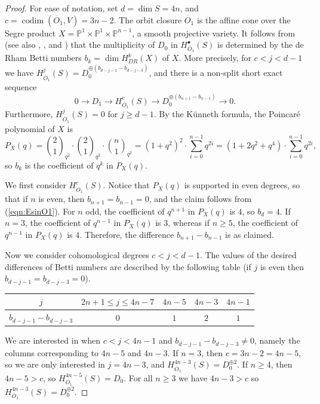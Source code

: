 \documentclass[11pt,reqno]{amsart}
\newcommand{\codim}{\operatorname{codim}}
\newcommand{\ol}[1]{\overline{#1}}
\numberwithin{equation}{section}
\begin{document}
\begin{proof}
For ease of notation, set $d=\dim S=4n$, and $c=\codim(\ol{O}_1, V)=3n-2$. The orbit closure $\ol{O}_1$ is the affine cone over the Segre product $X=\mathbb{P}^1\times \mathbb{P}^1\times \mathbb{P}^{n-1}$, a smooth projective variety. It follows from \cite[Theorem 4.8, Theorem 6.4]{hartshorne2018simple} (see also \cite[Main Theorem 1.2]{switala}, \cite[Theorem]{garsab}, and \cite[Theorem 3.1]{LSW}) that the multiplicity of $D_0$ in $H^{\bullet}_{\ol{O}_1}(S)$ is determined by the de Rham Betti numbers $b_k=\dim H^k_{DR}(X)$ of $X$. More precisely, for $c<j<d-1$ we have $H^j_{\ol{O}_1}(S)=D_0^{\oplus (b_{d-j-1}-b_{d-j-3})}$, and there is a non-split short exact sequence
\begin{equation}\label{eqn:EsinO1}
0\to D_1 \to H^{c}_{\ol{O}_1}(S)\to D_0^{\oplus (b_{n+1}-b_{n-1})}\to 0.
\end{equation}
Furthermore, $H^j_{\ol{O}_1}(S)=0$ for $j\geq d-1$. By the K\"{u}nneth formula, the Poincar\'{e} polynomial of $X$ is
$$
P_X(q)=\binom{2}{1}_{q^2}\cdot \binom{2}{1}_{q^2}\cdot \binom{n}{1}_{q^2}=(1+q^2)^2\cdot \sum_{i=0}^{n-1} q^{2i}=(1+2q^2+q^4)\cdot \sum_{i=0}^{n-1}q^{2i},
$$
so $b_k$ is the coefficient of $q^k$ in $P_X(q)$.

We first consider $H^c_{\ol{O}_1}(S)$. Notice that $P_X(q)$ is supported in even degrees, so
that if $n$ is even, then $b_{n+1}= b_{n-1} = 0$, and the claim follows from (\ref{eqn:EsinO1}). For $n$ odd, the coefficient of $q^{n+1}$ in $P_X(q)$
is $4$, so $b_d = 4$. If $n = 3$, the coefficient of $q^{n-1}$ in $P_X(q)$ is $3$, whereas if $n\geq 5$, the coefficient of
$q^{n-1}$ in $P_X(q)$ is $4$. Therefore, the difference $b_{n+1}- b_{n-1}$ is as claimed.

Now we consider cohomological degrees $c<j<d-1$. The values of the desired differences of Betti numbers are described by the following table (if $j$ is even then $b_{d-j-1}=b_{d-j-3}=0$).

\begin{center}
\begin{tabular}{||c ||  c | c | c | c ||} 
 \hline
 $j$ &  $2n+1\leq j \leq 4n-7$ & $4n-5$ & $4n-3$ & $4n-1$ \\ [0.5ex] 
 \hline\hline
 
 $b_{d-j-1}-b_{d-j-3}$ &  $0$ & $1$ & $2$ & $1$ \\ [1ex] 
 \hline
\end{tabular}
\end{center}
We are interested in when $c<j<4n-1$ and $b_{d-j-1}-b_{d-j-3}\neq 0$, namely the columns corresponding to $4n-5$ and $4n-3$. If $n=3$, then $c=3n-2=4n-5$, so we are only interested in $j=4n-3$, and $H^{4n-3}_{\ol{O}_1}(S)=D_0^{\oplus 2}$. If $n\geq 4$, then $4n-5>c$, so $H^{4n-5}_{\ol{O}_1}(S)=D_0$. For all $n\geq 3$ we have $4n-3>c$ so $H^{4n-3}_{\ol{O}_1}(S)=D_0^{\oplus 2}$.
\end{proof}
\end{document}
